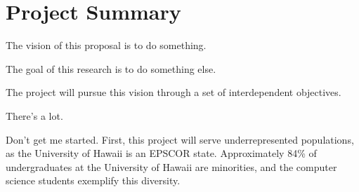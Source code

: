 
\section*{Project Summary}
\renewcommand{\thepage} {A--\arabic{page}}






  The vision of this proposal is to do something.

 The goal of this research is to do something else. 

The project will pursue this vision through a set of interdependent
objectives. 

\medskip

  There's a lot.

\medskip 

  Don't get me started. 
First, this project will serve
underrepresented populations, as the University of Hawaii is an EPSCOR
state. Approximately 84\% of undergraduates at the University of Hawaii are
minorities, and the computer science students exemplify this diversity.



